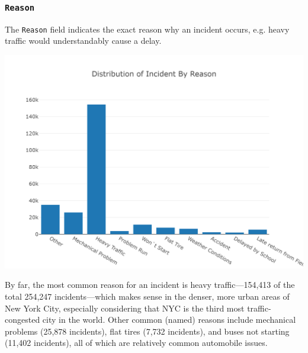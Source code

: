 \documentclass[11pt]{article}
\begin{document}
\subsubsection{\texttt{Reason}}
The \texttt{Reason} field indicates the exact reason why an incident occurs, e.g. heavy traffic would understandably cause a delay.
\begin{center}
\includegraphics[width=5.25in]{images/reason.png}
\end{center}
By far, the most common reason for an incident is heavy traffic---154,413 of the total 254,247 incidents---which makes sense in the denser, more urban areas of New York City, especially considering that NYC is the third most traffic-congested city in the world. Other common (named) reasons include mechanical problems (25,878 incidents), flat tires (7,732 incidents), and buses not starting (11,402 incidents), all of which are relatively common automobile issues.
\end{document}
